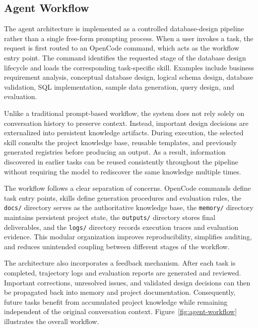 \subsection{Agent Workflow}

The agent architecture is implemented as a controlled database-design pipeline rather than a single free-form prompting process. When a user invokes a task, the request is first routed to an OpenCode command, which acts as the workflow entry point. The command identifies the requested stage of the database design lifecycle and loads the corresponding task-specific skill. Examples include business requirement analysis, conceptual database design, logical schema design, database validation, SQL implementation, sample data generation, query design, and evaluation.

Unlike a traditional prompt-based workflow, the system does not rely solely on conversation history to preserve context. Instead, important design decisions are externalized into persistent knowledge artifacts. During execution, the selected skill consults the project knowledge base, reusable templates, and previously generated registries before producing an output. As a result, information discovered in earlier tasks can be reused consistently throughout the pipeline without requiring the model to rediscover the same knowledge multiple times.

The workflow follows a clear separation of concerns. OpenCode commands define task entry points, skills define generation procedures and evaluation rules, the \texttt{docs/} directory serves as the authoritative knowledge base, the \texttt{memory/} directory maintains persistent project state, the \texttt{outputs/} directory stores final deliverables, and the \texttt{logs/} directory records execution traces and evaluation evidence. This modular organization improves reproducibility, simplifies auditing, and reduces unintended coupling between different stages of the workflow.

The architecture also incorporates a feedback mechanism. After each task is completed, trajectory logs and evaluation reports are generated and reviewed. Important corrections, unresolved issues, and validated design decisions can then be propagated back into memory and project documentation. Consequently, future tasks benefit from accumulated project knowledge while remaining independent of the original conversation context. Figure~\ref{fig:agent-workflow} illustrates the overall workflow.



